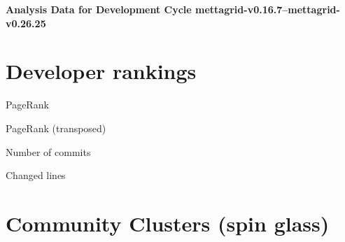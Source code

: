 \documentclass{article}
\begin{document}
\setlength{\parindent}{0pt}
\begin{center}
\begin{Large}
\textbf{Analysis Data for Development Cycle mettagrid-v0.16.7--mettagrid-v0.26.25}
\end{Large}
\end{center}
\section{Developer rankings}
\begin{small}\renewcommand{\tabcolsep}{1pt}
\begin{minipage}{0.5\linewidth}
PageRank\\

\end{minipage}%
\begin{minipage}{0.5\linewidth}
PageRank (transposed)\\

\end{minipage}

\renewcommand{\tabcolsep}{5pt}
\begin{minipage}{0.5\linewidth}
Number of commits\\

\end{minipage}%
\begin{minipage}{0.5\linewidth}
Changed lines\\

\end{minipage}
\end{small}
\newpage\section{Community Clusters (spin glass)}
\end{document}
